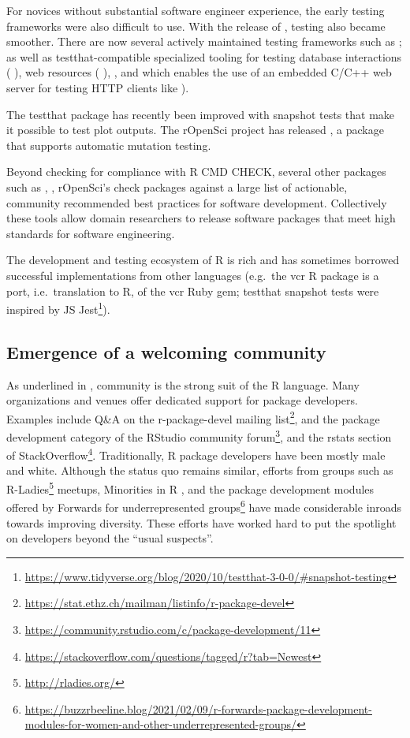 For novices without substantial software engineer experience, the early
testing frameworks were also difficult to use. With the release of
 \citep{testthat}, testing also became smoother. There
are now several actively maintained testing frameworks such as
 \citep{tinytest}; as well as testthat-compatible
specialized tooling for testing database interactions (
\citep{dittodb}), web resources ( \citep{vcr}),
 \citep{httptest}, and 
\citep{webfakes} which enables the use of an embedded C/C++ web server
for testing HTTP clients like  \citep{httr2}).

The testthat package has recently been improved with snapshot tests that
make it possible to test plot outputs. The rOpenSci project has released
 \citep{autotest}, a package that supports automatic
mutation testing.

Beyond checking for compliance with R CMD CHECK, several other packages
such as  \citep{goodpractice},
 \citep{riskmetric}, rOpenSci's 
\citep{pkgcheck} check packages against a large list of actionable,
community recommended best practices for software development.
Collectively these tools allow domain researchers to release software
packages that meet high standards for software engineering.

The development and testing ecosystem of R is rich and has sometimes
borrowed successful implementations from other languages (e.g.~the vcr R
package is a port, i.e.~translation to R, of the vcr Ruby gem; testthat
snapshot tests were inspired by JS Jest\footnote{\url{https://www.tidyverse.org/blog/2020/10/testthat-3-0-0/\#snapshot-testing}}).

\hypertarget{emergence-of-a-welcoming-community}{%
\subsection{Emergence of a welcoming
community}\label{emergence-of-a-welcoming-community}}

As underlined in \citet{rgeneration}, community is the strong suit of
the R language. Many organizations and venues offer dedicated support
for package developers. Examples include Q\&A on the r-package-devel
mailing list\footnote{\url{https://stat.ethz.ch/mailman/listinfo/r-package-devel}},
and the package development category of the RStudio community
forum\footnote{\url{https://community.rstudio.com/c/package-development/11}},
and the rstats section of StackOverflow\footnote{\url{https://stackoverflow.com/questions/tagged/r?tab=Newest}}.
Traditionally, R package developers have been mostly male and white.
Although the status quo remains similar, efforts from groups such as
R-Ladies\footnote{\url{http://rladies.org/}} meetups, Minorities in R
\citep{mir}, and the package development modules offered by Forwards for
underrepresented groups\footnote{\url{https://buzzrbeeline.blog/2021/02/09/r-forwards-package-development-modules-for-women-and-other-underrepresented-groups/}}
have made considerable inroads towards improving diversity. These
efforts have worked hard to put the spotlight on developers beyond the
``usual suspects''.

